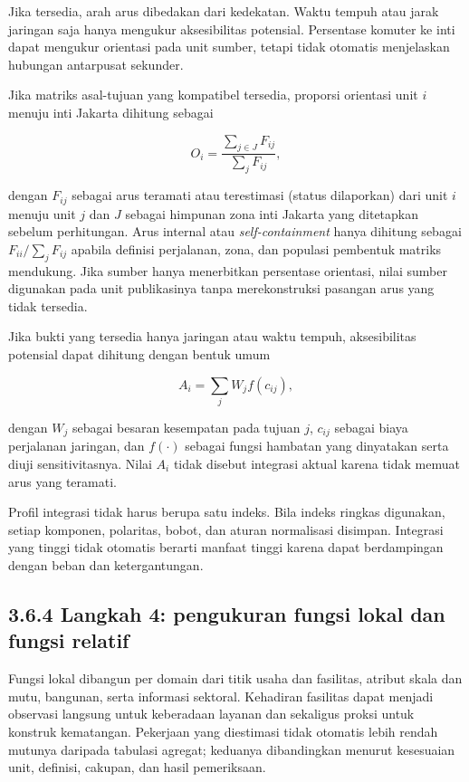\documentclass[
  indonesian,
  11pt,
  a4paper,
  oneside,
  openany]{report}
\begin{document}
Jika tersedia, arah arus dibedakan dari kedekatan. Waktu tempuh atau
jarak jaringan saja hanya mengukur aksesibilitas potensial. Persentase
komuter ke inti dapat mengukur orientasi pada unit sumber, tetapi tidak
otomatis menjelaskan hubungan antarpusat sekunder.

Jika matriks asal-tujuan yang kompatibel tersedia, proporsi orientasi
unit \(i\) menuju inti Jakarta dihitung sebagai

\[
O_i = \frac{\sum_{j \in J} F_{ij}}{\sum_j F_{ij}},
\]

dengan \(F_{ij}\) sebagai arus teramati atau terestimasi (status
dilaporkan) dari unit \(i\) menuju unit \(j\) dan \(J\) sebagai himpunan
zona inti Jakarta yang ditetapkan sebelum perhitungan. Arus internal
atau \emph{self-containment} hanya dihitung sebagai
\(F_{ii}/\sum_j F_{ij}\) apabila definisi perjalanan, zona, dan populasi
pembentuk matriks mendukung. Jika sumber hanya menerbitkan persentase
orientasi, nilai sumber digunakan pada unit publikasinya tanpa
merekonstruksi pasangan arus yang tidak tersedia.

Jika bukti yang tersedia hanya jaringan atau waktu tempuh, aksesibilitas
potensial dapat dihitung dengan bentuk umum

\[
A_i = \sum_j W_j f(c_{ij}),
\]

dengan \(W_j\) sebagai besaran kesempatan pada tujuan \(j\), \(c_{ij}\)
sebagai biaya perjalanan jaringan, dan \(f(\cdot)\) sebagai fungsi
hambatan yang dinyatakan serta diuji sensitivitasnya. Nilai \(A_i\)
tidak disebut integrasi aktual karena tidak memuat arus yang teramati.

Profil integrasi tidak harus berupa satu indeks. Bila indeks ringkas
digunakan, setiap komponen, polaritas, bobot, dan aturan normalisasi
disimpan. Integrasi yang tinggi tidak otomatis berarti manfaat tinggi
karena dapat berdampingan dengan beban dan ketergantungan.

\subsection{3.6.4 Langkah 4: pengukuran fungsi lokal dan fungsi
relatif}\label{langkah-4-pengukuran-fungsi-lokal-dan-fungsi-relatif}

Fungsi lokal dibangun per domain dari titik usaha dan fasilitas, atribut
skala dan mutu, bangunan, serta informasi sektoral. Kehadiran fasilitas
dapat menjadi observasi langsung untuk keberadaan layanan dan sekaligus
proksi untuk konstruk kematangan. Pekerjaan yang diestimasi tidak
otomatis lebih rendah mutunya daripada tabulasi agregat; keduanya
dibandingkan menurut kesesuaian unit, definisi, cakupan, dan hasil
pemeriksaan.
\end{document}
